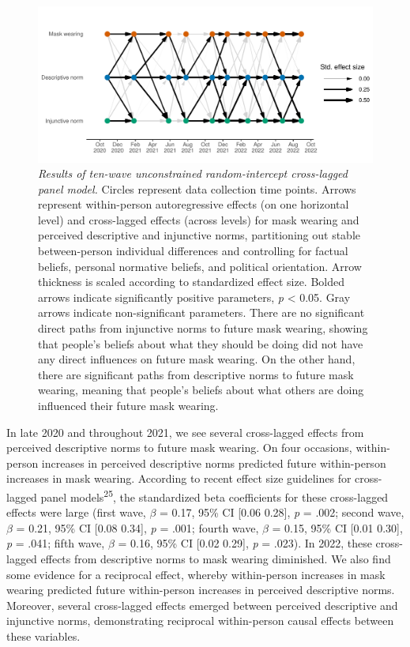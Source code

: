 \documentclass[
  man, donotrepeattitle,floatsintext]{apa6}
\begin{document}
\begin{figure}
\centering
\includegraphics{manuscript_files/figure-latex/plotRICLPM-1.pdf}
\caption{\label{fig:plotRICLPM}\emph{Results of ten-wave unconstrained random-intercept cross-lagged panel model.} Circles represent data collection time points. Arrows represent within-person autoregressive effects (on one horizontal level) and cross-lagged effects (across levels) for mask wearing and perceived descriptive and injunctive norms, partitioning out stable between-person individual differences and controlling for factual beliefs, personal normative beliefs, and political orientation. Arrow thickness is scaled according to standardized effect size. Bolded arrows indicate significantly positive parameters, \emph{p} \textless{} 0.05. Gray arrows indicate non-significant parameters. There are no significant direct paths from injunctive norms to future mask wearing, showing that people's beliefs about what they should be doing did not have any direct influences on future mask wearing. On the other hand, there are significant paths from descriptive norms to future mask wearing, meaning that people's beliefs about what others are doing influenced their future mask wearing.}
\end{figure}

In late 2020 and throughout 2021, we see several cross-lagged effects from perceived descriptive norms to future mask wearing. On four occasions, within-person increases in perceived descriptive norms predicted future within-person increases in mask wearing. According to recent effect size guidelines for cross-lagged panel models\textsuperscript{25}, the standardized beta coefficients for these cross-lagged effects were large (first wave, \(\beta\) = 0.17, 95\% CI {[}0.06 0.28{]}, \emph{p} = .002; second wave, \(\beta\) = 0.21, 95\% CI {[}0.08 0.34{]}, \emph{p} = .001; fourth wave, \(\beta\) = 0.15, 95\% CI {[}0.01 0.30{]}, \emph{p} = .041; fifth wave, \(\beta\) = 0.16, 95\% CI {[}0.02 0.29{]}, \emph{p} = .023). In 2022, these cross-lagged effects from descriptive norms to mask wearing diminished. We also find some evidence for a reciprocal effect, whereby within-person increases in mask wearing predicted future within-person increases in perceived descriptive norms. Moreover, several cross-lagged effects emerged between perceived descriptive and injunctive norms, demonstrating reciprocal within-person causal effects between these variables.
\end{document}
